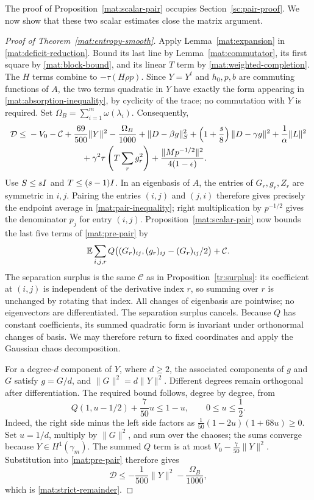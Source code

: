 The proof of Proposition~\ref{mat:scalar-pair} occupies
Section~\ref{sc:pair-proof}.  We now show that these two scalar estimates
close the matrix argument.

\begin{proof}[Proof of Theorem~\ref{mat:entropy-smooth}]
Apply Lemma~\ref{mat:expansion} in
\eqref{mat:deficit-reduction}.  Bound its last line by
Lemma~\ref{mat:commutator}, its first square by
\eqref{mat:block-bound}, and its linear $T$ term by
\eqref{mat:weighted-completion}.  The $H$ terms combine to
$-\tau(H\rho p)$.  Since $Y=Y^t$ and $h_0,p,b$ are commuting functions
of $A$, the two terms quadratic in $Y$ have exactly the form appearing
in \eqref{mat:absorption-inequality}, by cyclicity of the trace;
no commutation with $Y$ is required.  Set
$\Omega_B=\sum_{i=1}^m\omega(\lambda_i)$.  Consequently,
\begin{align}
 \mathscr D\le {}&-V_0-\mathcal C+\frac{69}{500}\|Y\|^2
    -\frac{\Omega_B}{1000}
    +\|D-\beta g\|_S^2
    +\left(1+\frac s8\right)\|D-\gamma g\|^2
    +\frac1\alpha\|L\|^2\nonumber\\
 &\hspace{22mm}+\gamma^2\tau\left(T\sum_rg_r^2\right)
    +\frac{\|Mp^{-1/2}\|^2}{4(1-\epsilon)}.
 \label{mat:pre-pair}
\end{align}
Use $S\le sI$ and $T\le(s-1)I$.  In an eigenbasis of $A$, the
entries of $G_r,g_r,Z_r$ are symmetric in $i,j$.  Pairing the entries
$(i,j)$ and $(j,i)$ therefore gives precisely the endpoint average in
\eqref{mat:pair-inequality}; right multiplication by $p^{-1/2}$ gives
the denominator $p_j$ for entry $(i,j)$.  Proposition~\ref{mat:scalar-pair}
now bounds the last five terms of \eqref{mat:pre-pair} by
\[
 \mathbb E\sum_{i,j,r}Q\bigl((G_r)_{ij},(g_r)_{ij}-(G_r)_{ij}/2\bigr)
       +\mathcal C.
\]
The separation surplus is the same $\mathcal C$ as in
Proposition~\ref{tr:surplus}: its coefficient at $(i,j)$ is independent
of the derivative index $r$, so summing over $r$ is unchanged by rotating
that index.  All changes of eigenbasis are pointwise; no eigenvectors are
differentiated.  The separation surplus cancels.
Because $Q$ has constant coefficients,
its summed quadratic form is invariant under orthonormal changes of
basis.  We may therefore return to fixed coordinates and apply the
Gaussian chaos decomposition.

For a degree-$d$ component of $Y$, where $d\ge2$, the associated
components of $g$ and $G$ satisfy $g=G/d$, and
$\|G\|^2=d\|Y\|^2$.  Different degrees remain orthogonal after
differentiation.  The required bound follows, degree by degree, from
\begin{equation}\label{mat:final-polynomial}
 Q(1,u-1/2)+\frac7{50}u\le1-u,
 \qquad 0\le u\le\frac12.
\end{equation}
Indeed, the right side minus the left side factors as
$\frac1{50}(1-2u)(1+68u)\ge0$.  Set $u=1/d$, multiply by
$\|G\|^2$, and sum over the chaoses; the sums converge because
$Y\in H^1(\gamma_m)$.  The summed $Q$ term is at most
$V_0-\frac7{50}\|Y\|^2$.  Substitution into
\eqref{mat:pre-pair} therefore gives
\[
 \mathscr D\le-\frac1{500}\|Y\|^2-\frac{\Omega_B}{1000},
\]
which is \eqref{mat:strict-remainder}.
\end{proof}
